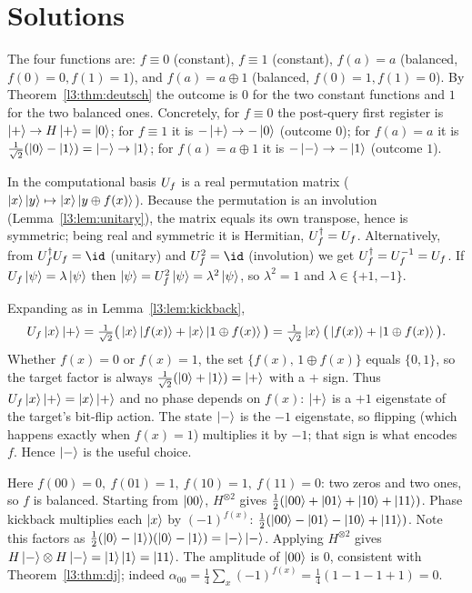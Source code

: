 \section{Solutions}

\begin{solution}
The four functions are: $f\equiv0$ (constant), $f\equiv1$ (constant),
$f(a)=a$ (balanced, $f(0)=0,f(1)=1$), and $f(a)=a\oplus1$ (balanced,
$f(0)=1,f(1)=0$). By Theorem~\ref{l3:thm:deutsch} the outcome is $0$ for the two
constant functions and $1$ for the two balanced ones. Concretely, for $f\equiv0$
the post-query first register is $\ket{+}\to H\ket{+}=\ket0$; for $f\equiv1$ it is
$-\ket{+}\to-\ket0$ (outcome $0$); for $f(a)=a$ it is
$\tfrac{1}{\sqrt2}(\ket0-\ket1)=\ket{-}\to\ket1$; for $f(a)=a\oplus1$ it is
$-\ket{-}\to-\ket1$ (outcome $1$).
\end{solution}

\begin{solution}
In the computational basis $U_f$ is a real permutation matrix
($\ket{x}\ket{y}\mapsto\ket{x}\ket{y\oplus f(x)}$). Because the permutation is an
involution (Lemma~\ref{l3:lem:unitary}), the matrix equals its own transpose, hence is
symmetric; being real and symmetric it is Hermitian, $U_f^{\dagger}=U_f$.
Alternatively, from $\Uf^{\dagger}\Uf=\id$ (unitary) and $\Uf^2=\id$ (involution) we
get $U_f^{\dagger}=U_f^{-1}=U_f$. If $U_f\ket{\psi}=\lambda\ket{\psi}$ then
$\ket{\psi}=U_f^2\ket{\psi}=\lambda^2\ket{\psi}$, so $\lambda^2=1$ and
$\lambda\in\{+1,-1\}$.
\end{solution}

\begin{solution}
Expanding as in Lemma~\ref{l3:lem:kickback},
\[
  U_f\ket{x}\ket{+}
  =\tfrac{1}{\sqrt2}\big(\ket{x}\ket{f(x)}+\ket{x}\ket{1\oplus f(x)}\big)
  =\tfrac{1}{\sqrt2}\ket{x}\big(\ket{f(x)}+\ket{1\oplus f(x)}\big).
\]
Whether $f(x)=0$ or $f(x)=1$, the set $\{f(x),\,1\oplus f(x)\}$ equals $\{0,1\}$,
so the target factor is always $\tfrac{1}{\sqrt2}(\ket0+\ket1)=\ket{+}$ with a
$+$ sign. Thus $U_f\ket{x}\ket{+}=\ket{x}\ket{+}$ and no phase depends on $f(x)$:
$\ket{+}$ is a $+1$ eigenstate of the target's bit-flip action. The state $\ket{-}$
is the $-1$ eigenstate, so flipping (which happens exactly when $f(x)=1$) multiplies
it by $-1$; that sign is what encodes $f$. Hence $\ket{-}$ is the useful choice.
\end{solution}

\begin{solution}
Here $f(00)=0,\ f(01)=1,\ f(10)=1,\ f(11)=0$: two zeros and two ones, so $f$ is
balanced. Starting from $\ket{00}$, $H^{\otimes2}$ gives
$\tfrac12(\ket{00}+\ket{01}+\ket{10}+\ket{11})$. Phase kickback multiplies each
$\ket{x}$ by $(-1)^{f(x)}$:
$\tfrac12(\ket{00}-\ket{01}-\ket{10}+\ket{11})$. Note this factors as
$\tfrac12(\ket0-\ket1)(\ket0-\ket1)=\ket{-}\ket{-}$. Applying $H^{\otimes2}$ gives
$H\ket{-}\otimes H\ket{-}=\ket1\ket1=\ket{11}$. The amplitude of $\ket{00}$ is $0$,
consistent with Theorem~\ref{l3:thm:dj}; indeed
$\alpha_{00}=\tfrac14\sum_x(-1)^{f(x)}=\tfrac14(1-1-1+1)=0$.
\end{solution}

